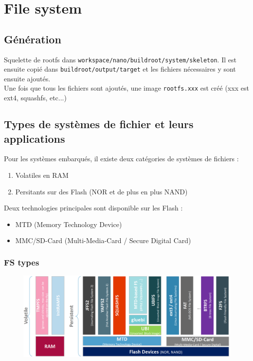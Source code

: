 \documentclass[resume]{subfiles}
\begin{document}
\section{File system}
\subsection{Génération}
Squelette de rootfs dans \verb!workspace/nano/buildroot/system/skeleton!. Il est ensuite copié dans \verb!buildroot/output/target! et les fichiers nécessaires y sont ensuite ajoutés.\\
Une fois que tous les fichiers sont ajoutés, une image \verb!rootfs.xxx! est créé (xxx est ext4, squashfs, etc...)

\subsection{Types de systèmes de fichier et leurs applications}

Pour les systèmes embarqués, il existe deux catégories de systèmes de fichiers :
\begin{enumerate}
    \item Volatiles en RAM
    \item Persitants sur des Flash (NOR et de plus en plus NAND)
\end{enumerate}

Deux technologies principales sont disponible sur les Flash :  
\begin{itemize}
    \item MTD (Memory Technology Device)
    \item MMC/SD-Card (Multi-Media-Card / Secure Digital Card)
\end{itemize}

\subsubsection{FS types}
\begin{figure}[H]
    \centering
    \includegraphics[width=1\columnwidth]{Figures/fileSystem/fileSystemType.PNG}
    \label{fig:fileSystemType}
\end{figure}
\end{document}
